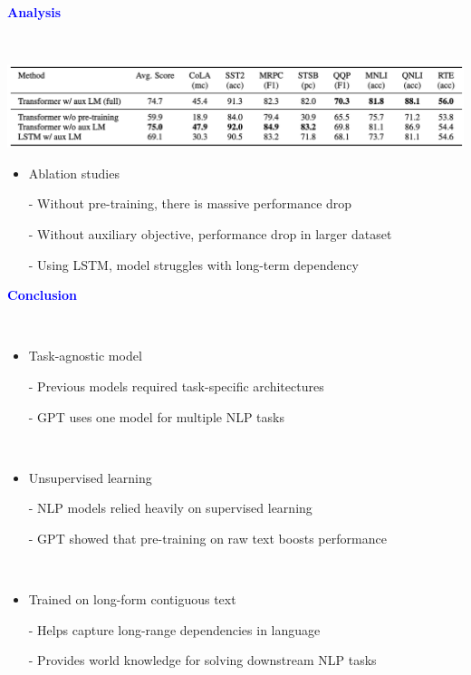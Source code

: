 \documentclass[professionalfont]{beamer}
\begin{document}
\begin{frame}

\begin{center}
    { \textbf{\textcolor{blue}{ {\fontsize{12}{14}\selectfont Analysis} }} }
\end{center}
\\[0.3cm]

\begin{center}
    \includegraphics[width=1.0\textwidth]{table/5.png}
\end{center}

{\fontsize{10}{14}\selectfont 
\begin{itemize}
    \item Ablation studies
    
    - Without pre-training, there is massive performance drop

    - Without auxiliary objective, performance drop in larger dataset

    - Using LSTM, model struggles with long-term dependency

\end{itemize}
}

\end{frame}

\begin{frame}

\begin{center}
    { \textbf{\textcolor{blue}{ {\fontsize{12}{14}\selectfont Conclusion} }} }
\end{center}
\\[0.3cm]

{\fontsize{10}{14}\selectfont 
\begin{itemize}
    \item Task-agnostic model
    
    - Previous models required task-specific architectures

    - GPT uses one model for multiple NLP tasks

    \\[0.3cm]

    \item Unsupervised learning

    - NLP models relied heavily on supervised learning

    - GPT showed that pre-training on raw text boosts performance

    \\[0.3cm]

    \item Trained on long-form contiguous text

    - Helps capture long-range dependencies in language

    - Provides world knowledge for solving downstream NLP tasks
\end{itemize}
}

\end{frame}
\end{document}
